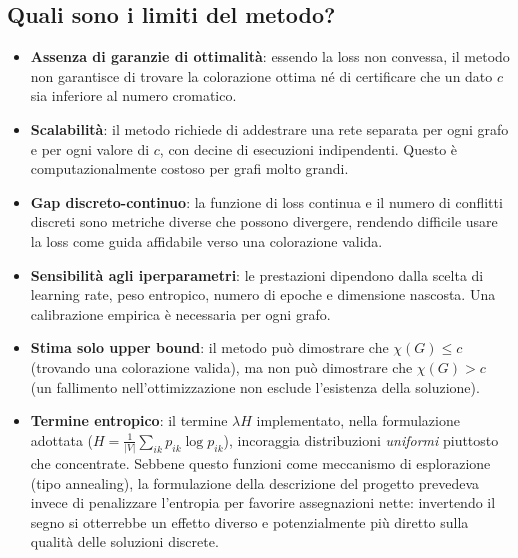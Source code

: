 \documentclass{article}
\begin{document}
\subsection*{Quali sono i limiti del metodo?}
\begin{itemize}
    \item \textbf{Assenza di garanzie di ottimalità}: essendo la loss non convessa, il
    metodo non garantisce di trovare la colorazione ottima né di certificare che un dato
    $c$ sia inferiore al numero cromatico.
    \item \textbf{Scalabilità}: il metodo richiede di addestrare una rete separata per
    ogni grafo e per ogni valore di $c$, con decine di esecuzioni indipendenti. Questo è
    computazionalmente costoso per grafi molto grandi.
    \item \textbf{Gap discreto-continuo}: la funzione di loss continua e il numero di
    conflitti discreti sono metriche diverse che possono divergere, rendendo difficile
    usare la loss come guida affidabile verso una colorazione valida.
    \item \textbf{Sensibilità agli iperparametri}: le prestazioni dipendono dalla scelta di
    learning rate, peso entropico, numero di epoche e dimensione nascosta. Una
    calibrazione empirica è necessaria per ogni grafo.
    \item \textbf{Stima solo upper bound}: il metodo può dimostrare che $\chi(G) \leq c$
    (trovando una colorazione valida), ma non può dimostrare che $\chi(G) > c$ (un
    fallimento nell'ottimizzazione non esclude l'esistenza della soluzione).
    \item \textbf{Termine entropico}: il termine $\lambda H$ implementato, nella formulazione
    adottata ($H = \frac{1}{|V|}\sum_{ik} p_{ik}\log p_{ik}$), incoraggia distribuzioni
    \emph{uniformi} piuttosto che concentrate. Sebbene questo funzioni come meccanismo di
    esplorazione (tipo annealing), la formulazione della descrizione del progetto prevedeva
    invece di penalizzare l'entropia per favorire assegnazioni nette: invertendo il segno
    si otterrebbe un effetto diverso e potenzialmente più diretto sulla qualità delle
    soluzioni discrete.
\end{itemize}
\end{document}
